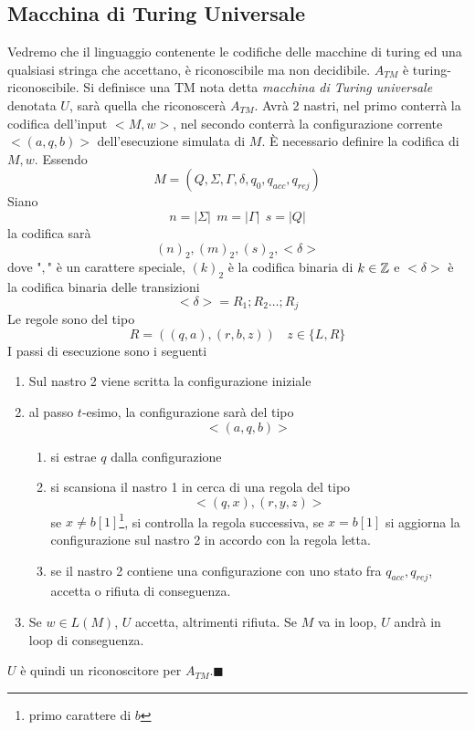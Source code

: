 \documentclass[10pt, letterpaper]{report}
\begin{document}
\subsection{Macchina di Turing Universale}
Vedremo che il linguaggio contenente le codifiche delle macchine di turing ed una qualsiasi stringa che accettano, è riconoscibile ma non decidibile.
\teo{} $A_{TM}$ è turing-riconoscibile.\acc 
\dimo{} Si definisce una TM nota detta \textit{macchina di Turing universale} denotata $U$, sarà quella che riconoscerà $A_{TM}$. Avrà 2 nastri, nel primo conterrà la codifica dell'input $<M,w>$, nel secondo conterrà la configurazione corrente $<(a,q,b)>$ dell'esecuzione simulata di $M$.\acc 
È necessario definire la codifica di $M,w$. Essendo 
$$ M=(Q,\Sigma,\Gamma,\delta,q_0,q_{acc},q_{rej})$$
Siano 
$$ n=|\Sigma| \ \ m=|\Gamma| \ \ s=|Q|$$
la codifica sarà 
$$ (n)_2,(m)_2,(s)_2,<\delta>$$
dove "$,$" è un carattere speciale, $(k)_2$ è la codifica binaria di $k\in{\mathbb Z}$ e $<\delta>$ è la codifica binaria delle transizioni 
$$ <\delta>=R_1;R_2\dots;R_j$$
Le regole sono del tipo 
$$ R=((q,a),(r,b,z)) \ \ \ \ z\in\{L,R\}$$
I passi di esecuzione sono i seguenti\begin{enumerate}
    \item Sul nastro 2 viene scritta la configurazione iniziale 
    \item al passo $t$-esimo, la configurazione sarà del tipo $$ <(a,q,b)>$$\begin{enumerate}
        \item si estrae $q$ dalla configurazione 
        \item si scansiona il nastro 1 in cerca di una regola del tipo $$ <(q,x),(r,y,z)>$$
        se $x\ne b[1]$\footnote{primo carattere di $b$}, si controlla la regola successiva, se $x=b[1]$
        si aggiorna la configurazione sul nastro 2 in accordo con la regola letta. 
        \item se il nastro 2 contiene una configurazione con uno stato fra $q_{acc},q_{rej}$, accetta o rifiuta di conseguenza. 
    \end{enumerate}
    \item Se $w\in L(M)$, $U$ accetta, altrimenti rifiuta. Se $M$ va in loop, $U$ andrà in loop di conseguenza. 
\end{enumerate}
$U$ è quindi un riconoscitore per $A_{TM}$.\hfill$\blacksquare$\acc 
\end{document}
